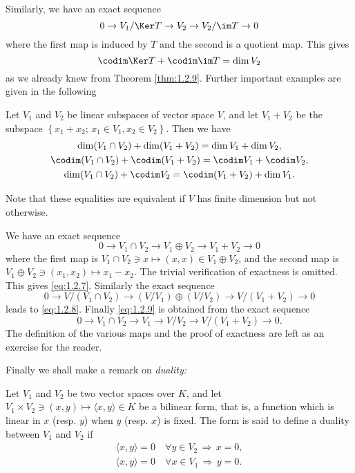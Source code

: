 Similarly, we have an exact sequence
\begin{displaymath}
  0\to V_1/\Ker T\to V_2\to V_2/\im T\to0
\end{displaymath}
where the first map is induced by $T$ and the  second is a quotient
map. This gives
\begin{displaymath}
  \codim \Ker T+\codim \im T=\dim V_2
\end{displaymath}
as we already knew from Theorem \ref{thm:1.2.9}. Further important
examples are given in the following
\begin{thm}
  \label{thm:1.2.11}
  Let $V_1$ and $V_2$ be linear subspaces of vector space $V$, and let
  $V_1+V_2$ be the subspace $\left\{ x_1+x_2;\,x_1\in V_1,x_2\in V_2
  \right\}$. Then we have
\begin{gather}
  \dim(V_1\cap V_2)+\dim(V_1+V_2) =\dim V_1+\dim V_2,\label{eq:1.2.7}\\
      \codim(V_1\cap
      V_2)+\codim(V_1+V_2)=\codim V_1+\codim V_2,\label{eq:1.2.8}\\
      \dim(V_1\cap
      V_2)+\codim V_2=\codim(V_1+V_2)+\dim V_1.\label{eq:1.2.9}
\end{gather}
\end{thm}
Note that these equalities are equivalent if $V$ has finite dimension
but not otherwise.
\begin{prf}
  We have an exact sequence
  \begin{displaymath}
    0\to V_1\cap V_2\to V_1\oplus V_2\to V_1+V_2\to0
  \end{displaymath}
where the first map is $V_1\cap V_2\ni x\mapsto(x,x)\in V_1\oplus
V_2$, and the second map is $V_1\oplus V_2\ni (x_1,x_2)\mapsto
x_1-x_2$. The trivial verification of exactness is omitted. This gives
\eqref{eq:1.2.7}. Similarly the exact sequence
\begin{displaymath}
  0\to V/(V_1\cap V_2)\to(V/V_1)\oplus(V/V_2)\to V/(V_1+V_2)\to0
\end{displaymath}
leads to \eqref{eq:1.2.8}. Finally \eqref{eq:1.2.9} is obtained from
the exact sequence
\begin{displaymath}
  0\to V_1\cap V_2\to V_1\to V/V_2\to V/(V_1+V_2)\to0.
\end{displaymath}
The definition of the various maps and the proof of exactness are left
as an exercise for the reader.
\end{prf}
Finally we shall make a remark on \emph{duality:}
\begin{dfn}
  Let $V_1$ and $V_2$ be two vector spaces over $K$, and let
  $V_1\times V_2\ni (x,y)\mapsto\langle x,y\rangle\in K$ be a bilinear
  form, that is, a function which is linear in $x$ (resp. $y$) when
  $y$ (resp. $x$) is fixed. The form is said to define a duality
  between $V_1$ and $V_2$ if
  \begin{gather}
    \langle x,y\rangle=0 \quad\forall y\in V_2\,\Longrightarrow\,
    x=0,\label{eq:1.2.10}
    \\
    \langle x,y\rangle=0 \quad\forall x\in V_1\,\Longrightarrow\, y=0.\label{eq:1.2.11}
  \end{gather}
\end{dfn}
